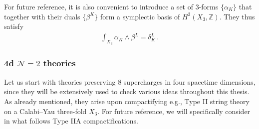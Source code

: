 For future reference, it is also convenient to introduce a set of 3-forms $\{\alpha_K\}$ that together with their duals $\{\beta^K\}$ form a symplectic basis of $H^3(X_3, \mathbb{Z})$. They thus satisfy 
%
\begin{align}\label{eq:symplecticbasis}
	\int_{X_3} \alpha_K \wedge \beta^L =\delta_K^L\, . 
\end{align}
%

\subsubsection{4d $\mathcal{N}=2$ theories} \label{sss:4dN=2basics}

Let us start with theories preserving 8 supercharges in four spacetime dimensions, since they will be extensively used to check various ideas throughout this thesis. As already mentioned, they arise upon compactifying e.g., Type II string theory on a Calabi--Yau three-fold $X_3$. For future reference, we will specifically consider in what follows Type IIA compactifications.


